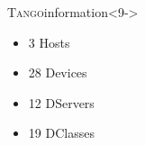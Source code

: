 \documentclass{beamer}
\newcommand{\tango}{\textsc{Tango}}
\begin{document}
\begin{frame}
\begin{textblock*}{35mm}
        \begin{exampleblock}{\tango information}<9->
            \begin{itemize}
                \item 3 Hosts
                \item 28 Devices
                \item 12 DServers
                \item 19 DClasses
            \end{itemize}
        \end{exampleblock}
    \end{textblock*}
\end{frame}

\end{document}
